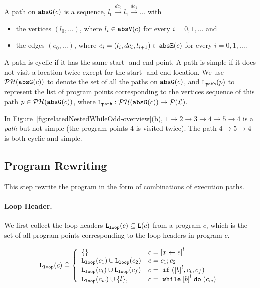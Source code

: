 \begin{defn}[Path]
 \label{def:abs_cfgpath} 
 A path on $\mathtt{abs}{\mathtt{G}}(c)$ is a sequence, $ l_0 \xrightarrow{dc_0} l_1 \xrightarrow{dc_1} \ldots $ with
 \begin{itemize}
 \item the vertices $(l_0, \ldots)$, where $l_i \in \mathtt{abs}{\mathtt{V}}(c)$ for every $i = 0, 1, \ldots$ and
 \item the edges $(e_0, \ldots)$, where $e_i = (l_{i}, dc_i, l_{i + 1}) \in \mathtt{abs}{\mathtt{E}}(c)$ for every $i = 0, 1, \ldots$.
 \end{itemize}
 A path is cyclic if it has the same start- and end-point. A path is simple if it does not visit a location twice except for the start- and end-location. We use $\mathcal{PH}(\mathtt{abs}{\mathtt{G}}(c))$ to denote the set of all the paths on $\mathtt{abs}{\mathtt{G}}(c)$,
 and $\mathtt{L}_{\mathtt{path}}(p)$ to represent the list of program points corresponding to the vertices sequence of this path $p \in \mathcal{PH}(\mathtt{abs}{\mathtt{G}}(c))$,
 where $\mathtt{L}_{\mathtt{path}}: \mathcal{PH}(\mathtt{abs}{\mathtt{G}}(c)) \to \mathcal{P}{(\mathcal{L})}$.
 \end{defn}
 In Figure~\ref{fig:relatedNestedWhileOdd-overview}(b), $1 \to 2 \to 3 \to 4 \to 5 \to 4$ is a \emph{path} but not simple (the program points $4$ is visited twice). The path $4 \to 5 \to 4$ is both cyclic and simple.


\subsection{Program Rewriting}
This step rewrite the program in the form of combinations of execution paths.



\paragraph{Loop Header.}
We first collect the loop headers $\mathtt{L}_{\mathtt{loop}}(c) \subseteq \mathtt{L}(c)$ from a program $c$, which is the set of all program points corresponding to the loop headers in program $c$.
\begin{defn}
  \label{def:loopl}
  \[
  \loopl(c) \triangleq 
  \left\{
    \begin{array}{ll}
      \{\}  & {c} = \clabel{\assign x e}^{l} \\
      \loopl({c_1}) \cup \loopl({{c_2}})  & {c} = {c_1};{c_2} \\
      \loopl(c_t) \cup \loopl({{c_f}})   & {c} =\eif(\clabel{\bexpr}^{l}, c_t, c_f) \\
  \loopl(c_w) \cup \{l\}, &  {c}   = \ewhile \clabel{\bexpr}^{l} \edo (c_w)
  \end{array}
\right.
\]
  \end{defn}

